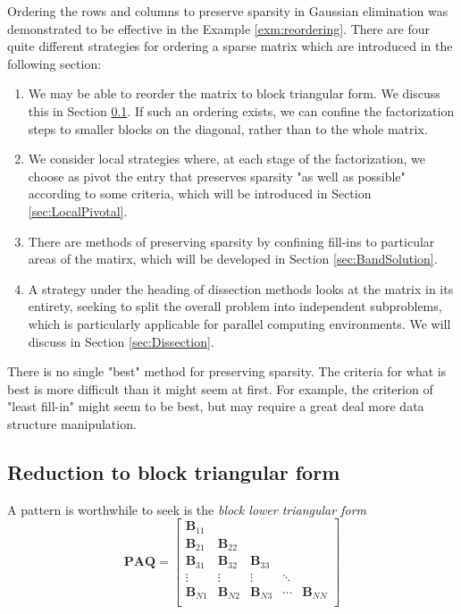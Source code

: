 \begin{rmk}
  Ordering the rows and columns to preserve sparsity in Gaussian
  elimination was demonstrated to be effective in the Example
  \ref{exm:reordering}.
  There are four quite different strategies for ordering a sparse
  matrix which are introduced in the following section:
  \begin{enumerate}
  \item We may be able to reorder the matrix to block
    triangular form. We discuss this in Section \ref{sec:GEforSM}. If
    such an ordering exists, we can confine the factorization steps to
    smaller blocks on the diagonal, rather than to the whole matrix.
  \item We consider local strategies where, at each stage of
    the factorization, we choose as pivot the entry that preserves
    sparsity "as well as possible" according to some criteria, which
    will be introduced in Section \ref{sec:LocalPivotal}.
  \item There are methods of preserving sparsity by confining
    fill-ins to particular areas of the matirx, which will be
    developed in Section \ref{sec:BandSolution}.
  \item A strategy under the heading of dissection methods
    looks at the matrix in its entirety, seeking to split the overall
    problem into independent subproblems, which is particularly
    applicable for parallel computing environments. We will discuss in
    Section \ref{sec:Dissection}.
  \end{enumerate}

  There is no single "best" method for preserving sparsity. The
  criteria for what is best is more difficult than it might seem at
  first. For example, the criterion of "least fill-in" might seem to
  be best, but may require a great deal more data structure
  manipulation. 
\end{rmk}
\subsection{Reduction to block triangular form}
\label{sec:GEforSM}
 
\begin{defn}
  \label{defn:BLTF}
  A pattern is worthwhile to seek is the \emph{block lower triangular form}
  \begin{equation}
    \label{eq:BLTF}
    \mathbf{PAQ}=\left[
    \begin{array}{ccccc}
      \mathbf{B}_{11}& & & & \\
     \mathbf{ B}_{21} & \mathbf{B}_{22} & & & \\
      \mathbf{B}_{31} & \mathbf{B}_{32} &\mathbf{B}_{33} & & \\
      \vdots&\vdots&\vdots&\ddots& \\
      \mathbf{B}_{N1}& \mathbf{B}_{N2}& \mathbf{B}_{N3} & \cdots& \mathbf{B}_{NN}\\
    \end{array}
  \right]
  \end{equation}
\end{defn}

